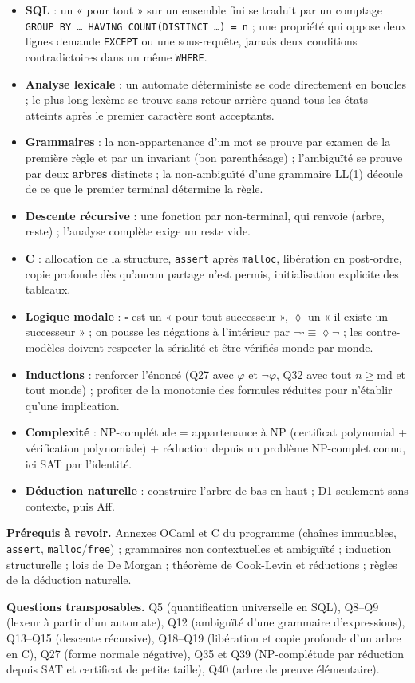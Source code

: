 \documentclass[11pt,a4paper]{article}
\providecommand{\tightlist}{\setlength{\itemsep}{0pt}\setlength{\parskip}{0pt}}
\providecommand{\Box}{\square}
\providecommand{\Diamond}{\lozenge}
\begin{document}
\begin{itemize}
\tightlist
\item
  \textbf{SQL} : un « pour tout » sur un ensemble fini se traduit par un comptage \texttt{GROUP\ BY\ …\ HAVING\ COUNT(\allowbreak{}DISTINCT\ …)\allowbreak{}\ =\allowbreak{}\ n} ; une propriété qui oppose deux lignes demande \texttt{EXCEPT} ou une sous-requête, jamais deux conditions contradictoires dans un même \texttt{WHERE}.
\item
  \textbf{Analyse lexicale} : un automate déterministe se code directement en boucles ; le plus long lexème se trouve sans retour arrière quand tous les états atteints après le premier caractère sont acceptants.
\item
  \textbf{Grammaires} : la non-appartenance d'un mot se prouve par examen de la première règle et par un invariant (bon parenthésage) ; l'ambiguïté se prouve par deux \textbf{arbres} distincts ; la non-ambiguïté d'une grammaire LL(1) découle de ce que le premier terminal détermine la règle.
\item
  \textbf{Descente récursive} : une fonction par non-terminal, qui renvoie (arbre, reste) ; l'analyse complète exige un reste vide.
\item
  \textbf{C} : allocation de la structure, \texttt{assert} après \texttt{malloc}, libération en post-ordre, copie profonde dès qu'aucun partage n'est permis, initialisation explicite des tableaux.
\item
  \textbf{Logique modale} : \(\Box\) est un « pour tout successeur », \(\Diamond\) un « il existe un successeur » ; on pousse les négations à l'intérieur par \(\neg\Box\equiv\Diamond\neg\) ; les contre-modèles doivent respecter la sérialité et être vérifiés monde par monde.
\item
  \textbf{Inductions} : renforcer l'énoncé (Q27 avec \(\varphi\) et \(\neg\varphi\), Q32 avec tout \(n\ge\mathrm{md}\) et tout monde) ; profiter de la monotonie des formules réduites pour n'établir qu'une implication.
\item
  \textbf{Complexité} : NP-complétude = appartenance à NP (certificat polynomial + vérification polynomiale) + réduction depuis un problème NP-complet connu, ici SAT par l'identité.
\item
  \textbf{Déduction naturelle} : construire l'arbre de bas en haut ; D1 seulement sans contexte, puis Aff.
\end{itemize}

\textbf{Prérequis à revoir.} Annexes OCaml et C du programme (chaînes immuables, \texttt{assert}, \texttt{malloc}/\texttt{free}) ; grammaires non contextuelles et ambiguïté ; induction structurelle ; lois de De Morgan ; théorème de Cook-Levin et réductions ; règles de la déduction naturelle.

\textbf{Questions transposables.} Q5 (quantification universelle en SQL), Q8--Q9 (lexeur à partir d'un automate), Q12 (ambiguïté d'une grammaire d'expressions), Q13--Q15 (descente récursive), Q18--Q19 (libération et copie profonde d'un arbre en C), Q27 (forme normale négative), Q35 et Q39 (NP-complétude par réduction depuis SAT et certificat de petite taille), Q40 (arbre de preuve élémentaire).
\end{document}

